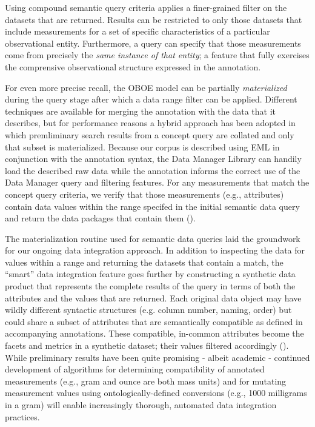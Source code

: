 Using compound semantic query criteria applies a finer-grained filter on the datasets that are
returned. Results can be restricted to only those datasets that include 
measurements for a set of specific characteristics of a particular
observational entity. Furthermore, a query can specify that those measurements come
from precisely the \emph{same instance of that entity}; a feature that fully exercises the comprensive observational structure expressed in the annotation.

 For even more precise recall, the OBOE model can be partially \emph{materialized} during the query stage after which a data range filter can be applied. Different techniques are available for merging the annotation with the data that it describes, but for performance reasons a hybrid approach has been adopted in which premliminary search results from a concept query are collated and only that subset is materialized. Because our corpus is described using EML in conjunction with the annotation syntax, the Data Manager Library can handily load the described raw data while the annotation informs the correct use of the Data Manager query and filtering features. For any measurements that match the concept query criteria, we verify that those measurements (e.g., attributes) contain data values within the range specifed in the initial semantic data query and return the data packages that contain them ().

 The materialization routine used for semantic data queries laid the groundwork for our ongoing data integration approach. In addition to inspecting the data for values within a range and returning the datasets that contain a match, the ``smart'' data integration feature goes further by constructing a synthetic data product that represents the complete results of the query in terms of both the attributes and the values that are returned. Each original data object may have wildly different syntactic structures (e.g. column number, naming, order) but could share a subset of attributes that are semantically compatible as defined in accompanying annotations. These compatible, in-common attributes become the facets and metrics in a synthetic dataset; their values filtered accordingly (). While preliminary results have been quite promising - albeit academic - continued development of algorithms for determining compatibility of annotated measurements (e.g., gram and ounce are both mass units) and for mutating measurement values using ontologically-defined conversions (e.g., 1000 milligrams in a gram) will enable increasingly thorough, automated data integration practices.


